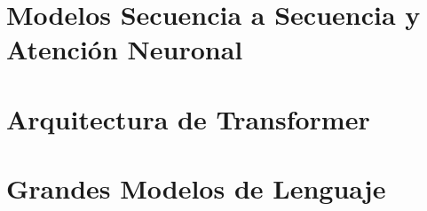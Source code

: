 \documentclass{book}
\begin{document}
\chapter{Modelos Secuencia a Secuencia y Atención Neuronal}
\label{cap_sec}



\chapter{Arquitectura de Transformer}
\label{cap_trans}




        
        
\chapter{Grandes Modelos de Lenguaje}
\label{cap_llm}









\end{document}
